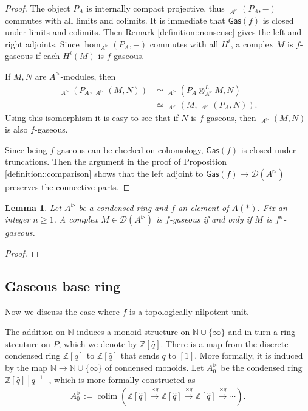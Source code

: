 \documentclass{article}
\theoremstyle{plain}
\newtheorem{lem}[thm]{Lemma}
\theoremstyle{definition}
\theoremstyle{remark}
\DeclareMathOperator{\colim}{colim}
\DeclareMathOperator{\rhoms}{\underline{RHom}}
\newcommand{\dten}{\otimes ^{L}}
\newcommand{\huflag}{\triangleright}
\newcommand{\D}{\mathcal{D}}
\begin{document}
\begin{proof}
The object $ P _{A} $ is internally compact projective, thus $ \rhoms _{A ^{\huflag}}(P _{A}, -) $ commutes with all limits and colimits.
It is immediate that $ \mathsf{Gas}(f) $ is closed under limits and colimits.
Then Remark \ref{definition::nonsense} gives the left and right adjoints.
Since $ \hom _{A ^{\huflag}}(P _{A}, -) $ commutes with all $ H ^{i} $, a complex $ M $ is $ f $-gaseous if each $ H ^{i}(M) $ is $ f $-gaseous.

If $ M,N $ are $ A ^{\huflag} $-modules, then
\begin{align*}
\rhoms _{A ^{\huflag}}(P _{A}, \rhoms _{A ^{\huflag}}(M, N))
&\simeq \rhoms _{A ^{\huflag}}(P _{A}\dten _{A ^{\huflag}} M, N)\\
&\simeq \rhoms _{A ^{\huflag}}(M, \rhoms _{A ^{\huflag}}(P _{A}, N)).
\end{align*}
Using this isomorphism it is easy to see that if $ N $ is $ f $-gaseous,
then $ \rhoms _{A ^{\huflag}}(M, N) $ is also $ f $-gaseous.

Since being $ f $-gaseous can be checked on cohomology, $ \mathsf{Gas}(f) $ is closed under truncations.
Then the argument in the proof of Proposition \ref{definition::comparison} shows that
the left adjoint to $ \mathsf{Gas}(f)\to \D (A ^{\huflag}) $ preserves the connective parts.
\end{proof}

\begin{lem}
Let $ A ^{\huflag} $ be a condensed ring and $ f $ an element of $ A (*) $.
Fix an integer $ n \geq 1 $.
A complex $ M\in \D (A ^{\huflag}) $ is $ f $-gaseous if and only if $ M $ is $ f ^{n} $-gaseous.
\end{lem}

\begin{proof}

\end{proof}

\subsection{Gaseous base ring}

Now we discuss the case where $ f $ is a topologically nilpotent unit.

The addition on $ \mathbb{N} $ induces a monoid structure on $ \mathbb{N}\cup \{\infty\} $
and in turn a ring strcuture on $ P $,
which we denote by $ \mathbb{Z}[\hat{q}] $.
There is a map from the discrete condensed ring $ \mathbb{Z}[q] $ to $ \mathbb{Z}[\hat{q}] $
that sends $ q $ to $ [1] $.
More formally, it is induced by the map $ \mathbb{N}\to \mathbb{N}\cup \{\infty\} $ of condensed monoids.
Let $ A _{0}^{\huflag} $ be the condensed ring $ \mathbb{Z}[\hat{q}][q ^{-1}]$,
which is more formally constructed as
\begin{equation*}
A _{0}^{\huflag} := \colim (\mathbb{Z}[\hat{q}] \xrightarrow{\times q} \mathbb{Z}[\hat{q}]\xrightarrow{\times q} \mathbb{Z}[\hat{q}]\xrightarrow{\times q} \cdots   ).
\end{equation*}
\end{document}
